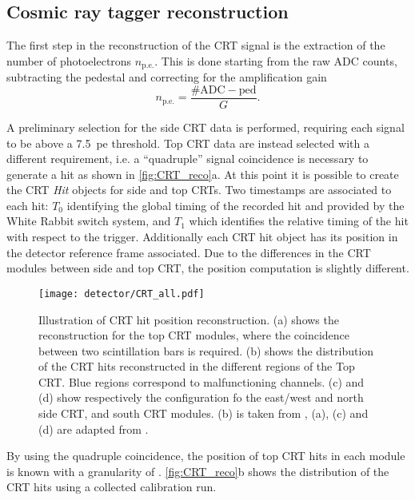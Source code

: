 \subsection{Cosmic ray tagger reconstruction} 

The first step in the reconstruction of the CRT signal is the extraction of the number of photoelectrons $n_\mathrm{p.e.}$. This is done starting from the raw ADC counts, subtracting the pedestal and correcting for the amplification gain \begin{equation}
    n_\mathrm{p.e.} = \frac{\mathrm{\#ADC} - \mathrm{ped}}{G}. 
\end{equation} 

A preliminary selection for the side CRT data is performed, requiring each signal to be above a \SI{7.5}{pe} threshold. Top CRT data are instead selected with a different requirement, i.e. a ``quadruple'' signal coincidence is necessary to generate a hit as shown in \autoref{fig:CRT_reco}a. At this point it is possible to create the CRT \emph{Hit} objects for side and top CRTs. Two timestamps are associated to each hit: $T_0$ identifying the global timing of the recorded hit and provided by the White Rabbit switch system, and $T_1$ which identifies the relative timing of the hit with respect to the trigger. Additionally each CRT hit object has its position in the detector reference frame associated. Due to the differences in the CRT modules between side and top CRT, the position computation is slightly different. 

\begin{figure}
    \centering
    \texttt{[image: detector/CRT\_all.pdf]}
    \caption[CRT Hit reconstruction in space]{Illustration of CRT hit position reconstruction. (a) shows the reconstruction for the top CRT modules, where the coincidence between two scintillation bars is required. (b) shows the distribution of the CRT hits reconstructed in the different regions of the Top CRT. Blue regions correspond to malfunctioning channels. (c) and (d) show respectively the configuration fo the east/west and north side CRT, and south CRT modules. (b) is taken from \cite{Poppi:2023zmp}, (a), (c) and (d) are adapted from \cite{arteroponsStudyReconstructionNuMuCC}.}
    \label{fig:CRT_reco}
\end{figure}

By using the quadruple coincidence, the position of top CRT hits in each module is known with a granularity of . \autoref{fig:CRT_reco}b shows the distribution of the CRT hits using a collected calibration run. 

